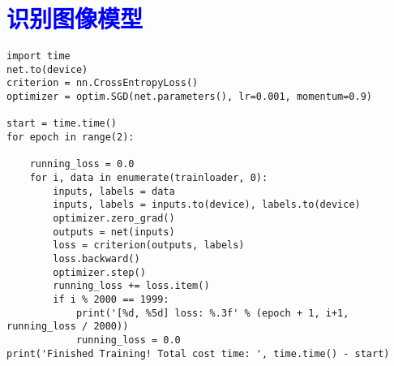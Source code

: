 \documentclass{article}
\begin{document}
\section{\textcolor{blue}{识别图像模型}}
\begin{lstlisting}
import time
net.to(device)
criterion = nn.CrossEntropyLoss()
optimizer = optim.SGD(net.parameters(), lr=0.001, momentum=0.9)

start = time.time()
for epoch in range(2):

    running_loss = 0.0
    for i, data in enumerate(trainloader, 0):
        inputs, labels = data
        inputs, labels = inputs.to(device), labels.to(device)
        optimizer.zero_grad()
        outputs = net(inputs)
        loss = criterion(outputs, labels)
        loss.backward()
        optimizer.step()
        running_loss += loss.item()
        if i % 2000 == 1999:
            print('[%d, %5d] loss: %.3f' % (epoch + 1, i+1, running_loss / 2000))
            running_loss = 0.0
print('Finished Training! Total cost time: ', time.time() - start)
\end{lstlisting}
\end{document}
